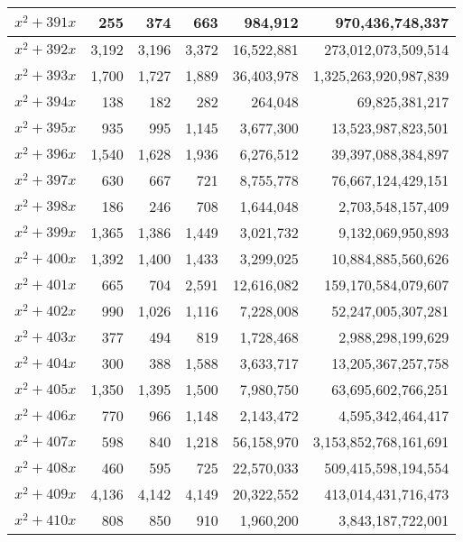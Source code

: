 \documentclass{article}
\begin{document}
\begin{center}
\begin{tabular}{ | c | r | r | r | r | r | }
$x^2 + 391x$ & 255 & 374 & 663 & 984{,}912 & 970{,}436{,}748{,}337 \\ \hline
$x^2 + 392x$ & 3{,}192 & 3{,}196 & 3{,}372 & 16{,}522{,}881 & 273{,}012{,}073{,}509{,}514 \\ \hline
$x^2 + 393x$ & 1{,}700 & 1{,}727 & 1{,}889 & 36{,}403{,}978 & 1{,}325{,}263{,}920{,}987{,}839 \\ \hline
$x^2 + 394x$ & 138 & 182 & 282 & 264{,}048 & 69{,}825{,}381{,}217 \\ \hline
$x^2 + 395x$ & 935 & 995 & 1{,}145 & 3{,}677{,}300 & 13{,}523{,}987{,}823{,}501 \\ \hline
$x^2 + 396x$ & 1{,}540 & 1{,}628 & 1{,}936 & 6{,}276{,}512 & 39{,}397{,}088{,}384{,}897 \\ \hline
$x^2 + 397x$ & 630 & 667 & 721 & 8{,}755{,}778 & 76{,}667{,}124{,}429{,}151 \\ \hline
$x^2 + 398x$ & 186 & 246 & 708 & 1{,}644{,}048 & 2{,}703{,}548{,}157{,}409 \\ \hline
$x^2 + 399x$ & 1{,}365 & 1{,}386 & 1{,}449 & 3{,}021{,}732 & 9{,}132{,}069{,}950{,}893 \\ \hline
$x^2 + 400x$ & 1{,}392 & 1{,}400 & 1{,}433 & 3{,}299{,}025 & 10{,}884{,}885{,}560{,}626 \\ \hline
$x^2 + 401x$ & 665 & 704 & 2{,}591 & 12{,}616{,}082 & 159{,}170{,}584{,}079{,}607 \\ \hline
$x^2 + 402x$ & 990 & 1{,}026 & 1{,}116 & 7{,}228{,}008 & 52{,}247{,}005{,}307{,}281 \\ \hline
$x^2 + 403x$ & 377 & 494 & 819 & 1{,}728{,}468 & 2{,}988{,}298{,}199{,}629 \\ \hline
$x^2 + 404x$ & 300 & 388 & 1{,}588 & 3{,}633{,}717 & 13{,}205{,}367{,}257{,}758 \\ \hline
$x^2 + 405x$ & 1{,}350 & 1{,}395 & 1{,}500 & 7{,}980{,}750 & 63{,}695{,}602{,}766{,}251 \\ \hline
$x^2 + 406x$ & 770 & 966 & 1{,}148 & 2{,}143{,}472 & 4{,}595{,}342{,}464{,}417 \\ \hline
$x^2 + 407x$ & 598 & 840 & 1{,}218 & 56{,}158{,}970 & 3{,}153{,}852{,}768{,}161{,}691 \\ \hline
$x^2 + 408x$ & 460 & 595 & 725 & 22{,}570{,}033 & 509{,}415{,}598{,}194{,}554 \\ \hline
$x^2 + 409x$ & 4{,}136 & 4{,}142 & 4{,}149 & 20{,}322{,}552 & 413{,}014{,}431{,}716{,}473 \\ \hline
$x^2 + 410x$ & 808 & 850 & 910 & 1{,}960{,}200 & 3{,}843{,}187{,}722{,}001 \\ \hline

\end{tabular}
\end{center}
\end{document}
